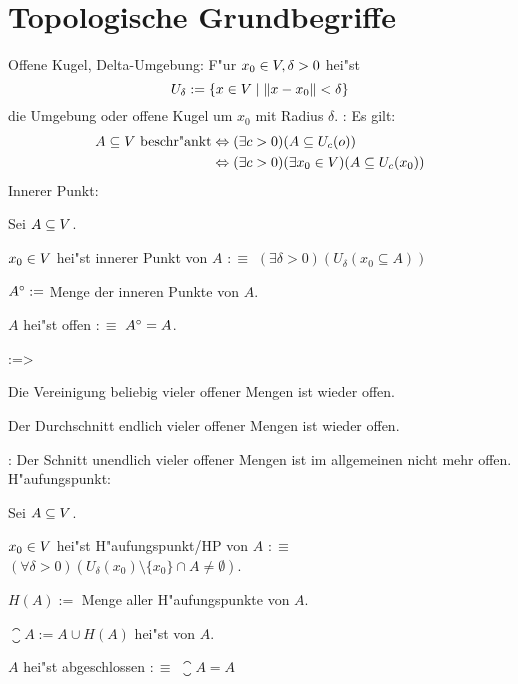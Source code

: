 \section{Topologische Grundbegriffe}
\lesserdefinition Offene Kugel, Delta-Umgebung:{ 
  F"ur $x_0\in V,\delta>0$ hei"st 
  \[U_\delta:=\{x\in V\mid{\left\| x-x_0\right\|}<\delta\}
    \] 
  die Umgebung oder offene Kugel um $x_0$ mit Radius $\delta$.
  }
\remark:{
  Es gilt:
  \begin{align*}
    A\subseteq V \text{ beschr"ankt} & \Leftrightarrow (\exists c>0)(A\subseteq U_c(o)) \\
      & \Leftrightarrow (\exists c>0)(\exists x_0\in V)(A\subseteq U_c(x_0))
    \end{align*}
  }
 Innerer Punkt:{
  Sei $A\subseteq V$.
  \begin{stmts}
    \item $x_0\in V$ hei"st innerer Punkt von $A$ $:\equiv$ 
      $(\exists \delta>0)(U_\delta(x_0\subseteq A))$
    \item ${A}^\circ:=$ Menge der inneren Punkte von $A$.
    \item $A$ hei"st offen $:\equiv$ ${A}^\circ=A$.
    \end{stmts}
  }
\theorem:=>{
  \begin{stmts}
    \item Die Vereinigung beliebig vieler offener Mengen ist wieder offen.
    \item Der Durchschnitt endlich vieler offener Mengen ist wieder offen.
    \end{stmts}
  }
\remark:{
  Der Schnitt unendlich vieler offener Mengen ist im allgemeinen nicht mehr 
  offen.
  }
 H"aufungspunkt:{
  Sei $A\subseteq V$.
  \begin{stmts}
    \item $x_0\in V$ hei"st H"aufungspunkt/HP von $A$ $:\equiv$
      $(\forall \delta>0)(U_\delta(x_0)\setminus\{x_0\}\cap A \neq \emptyset)$.
    \item $H(A):=$ Menge aller H"aufungspunkte von $A$.
    \item $\closure A:=A\cup H(A)$ hei"st  von $A$.
    \item $A$ hei"st abgeschlossen $:\equiv$ $\closure A=A$
    \end{stmts}
  }
